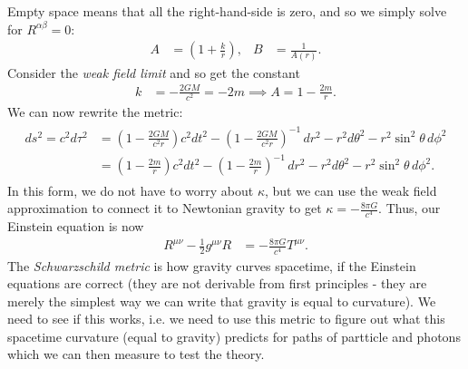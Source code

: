 \documentclass[a4paper, 11pt, normalem]{report}
\begin{document}
Empty space means that all the right-hand-side is zero, and so we simply solve for $R^{\alpha\beta}=0$:
\begin{align}
    A &= \left(1 + \frac{k}{r}\right), & B &= \frac{1}{A(r)}.
\end{align}
Consider the \emph{weak field limit} and so get the constant
\begin{align}
    k &= -\frac{2GM}{c^2} = -2m \implies A = 1 - \frac{2m}{r}.
\end{align}
We can now rewrite the metric:
\begin{align}
    \begin{split}
        ds^2 = c^2d\tau^2 &= \left(1-\frac{2GM}{c^2r}\right)c^2dt^2 - \left(1-\frac{2GM}{c^2r}\right)^{-1}\,dr^2 - r^2d\theta^2 - r^2\sin^2\theta\,d\phi^2 \\
                          &= \left(1-\frac{2m}{r}\right)c^2dt^2 - \left(1-\frac{2m}{r}\right)^{-1}\,dr^2- r^2d\theta^2 - r^2\sin^2\theta\,d\phi^2.
    \end{split}
\end{align}
In this form, we do not have to worry about $\kappa$, but we can use the weak field approximation to connect it to Newtonian gravity to get $\kappa=-\frac{8\pi G}{c^4}$. 
Thus, our Einstein equation is now
\begin{align}
    R^{\mu\nu} - \frac12g^{\mu\nu}R &= -\frac{8\pi G}{c^4}T^{\mu\nu}.
\end{align}
The \emph{Schwarzschild metric} is how gravity curves spacetime, if the Einstein equations are correct (they are not derivable from first principles - they are merely the simplest way we can write that gravity is equal to curvature).
We need to see if this works, i.e. we need to use this metric to figure out what this spacetime curvature (equal to gravity) predicts for paths of partticle and photons which we can then measure to test the theory. 
\end{document}
